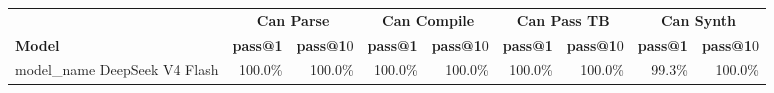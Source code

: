 \begin{tabular}{l|rr|rr|rr|rr}
\cmidrule[\heavyrulewidth]{2-9}
 & \multicolumn{2}{c|}{\textbf{Can Parse}} & \multicolumn{2}{c|}{\textbf{Can Compile}} & \multicolumn{2}{c|}{\textbf{Can Pass TB}} & \multicolumn{2}{c}{\textbf{Can Synth}} \\
 \textbf{Model} & \textbf{pass@1} & \textbf{pass@1}0 & \textbf{pass@1} & \textbf{pass@1}0 & \textbf{pass@1} & \textbf{pass@1}0 & \textbf{pass@1} & \textbf{pass@1}0 \\
model\_name\midrule
DeepSeek V4 Flash & 100.0\% & 100.0\% & 100.0\% & 100.0\% & 100.0\% & 100.0\% & 99.3\% & 100.0\% \\
\bottomrule
\end{tabular}